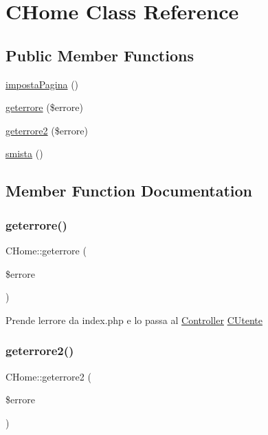 \hypertarget{class_c_home}{}\section{C\+Home Class Reference}
\label{class_c_home}
\subsection*{Public Member Functions}
\begin{DoxyCompactItemize}
\item 
\mbox{\hyperlink{class_c_home_ac911ed43be450d553e5cc4e86a9d98e5}{imposta\+Pagina}} ()
\item 
\mbox{\hyperlink{class_c_home_a99d8bbaf6923501463d992ed241f656c}{geterrore}} (\$errore)
\item 
\mbox{\hyperlink{class_c_home_a48f40e7fc1bbc717c25c19af4f9d2de7}{geterrore2}} (\$errore)
\item 
\mbox{\hyperlink{class_c_home_a7a0847d615087420fe682217b42d99c9}{smista}} ()
\end{DoxyCompactItemize}


\subsection{Member Function Documentation}
\mbox{\label{class_c_home_a99d8bbaf6923501463d992ed241f656c}} 
\subsubsection{\texorpdfstring{geterrore()}{geterrore()}}
{\footnotesize\ttfamily C\+Home\+::geterrore (\begin{DoxyParamCaption}\item[{}]{\$errore }\end{DoxyParamCaption})}

Prende l\textquotesingle{}errore da index.\+php e lo passa al \mbox{\hyperlink{namespace_controller}{Controller}} \mbox{\hyperlink{class_c_utente}{C\+Utente}} \mbox{\label{class_c_home_a48f40e7fc1bbc717c25c19af4f9d2de7}} 
\subsubsection{\texorpdfstring{geterrore2()}{geterrore2()}}
{\footnotesize\ttfamily C\+Home\+::geterrore2 (\begin{DoxyParamCaption}\item[{}]{\$errore }\end{DoxyParamCaption})}

